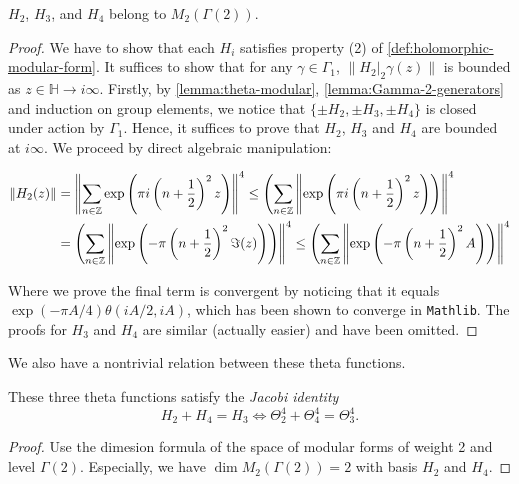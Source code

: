 \begin{lemma}\label{lemma:theta-modular}\leanok
$H_{2}$, $H_{3}$, and $H_{4}$ belong to $M_2(\Gamma(2))$.
\end{lemma}
\begin{proof}
  We have to show that each $H_i$ satisfies property (2) of \cref{def:holomorphic-modular-form}. It suffices to show that for any $\gamma \in \Gamma_1$, $\|H_2|_2\gamma(z)\|$ is bounded as $z \in \mathbb{H} \to i\infty$. Firstly, by \cref{lemma:theta-modular}, \cref{lemma:Gamma-2-generators} and induction on group elements, we notice that $\{\pm H_2, \pm H_3, \pm H_4\}$ is closed under action by $\Gamma_1$. Hence, it suffices to prove that $H_2$, $H_3$ and $H_4$ are bounded at $i\infty$. We proceed by direct algebraic manipulation:

\begin{align}
  \|H_2(z)\|
  &= \left\|\sum_{n \in \mathbb{Z}} \exp\left(\pi i \left(n + \frac{1}{2}\right)^2 z\right)\right\|^4
  \leq \left(\sum_{n \in \mathbb{Z}} \left\|\exp\left(\pi i \left(n + \frac{1}{2}\right)^2 z\right)\right)\right\|^4 \\
  &= \left(\sum_{n \in \mathbb{Z}} \left\|\exp\left(-\pi \left(n + \frac{1}{2}\right)^2 \Im(z)\right)\right)\right\|^4
  \leq \left(\sum_{n \in \mathbb{Z}} \left\|\exp\left(-\pi \left(n + \frac{1}{2}\right)^2 A\right)\right)\right\|^4
\end{align}

  Where we prove the final term is convergent by noticing that it equals $\exp(-\pi A / 4)\theta(iA / 2, iA)$, which has been shown to converge in \texttt{Mathlib}. The proofs for $H_3$ and $H_4$ are similar (actually easier) and have been omitted.

\end{proof}

We also have a nontrivial relation between these theta functions.
\begin{lemma}\label{lemma:jacobi-identity}
These three theta functions satisfy the \emph{Jacobi identity}
\begin{equation}\label{eqn:jacobi-identity}
H_{2} + H_{4} = H_{3} \Leftrightarrow \Theta_{2}^4+ \Theta_{4}^4= \Theta_{3}^4.
\end{equation}
\end{lemma}
\begin{proof}
Use the dimesion formula of the space of modular forms of weight 2 and level $\Gamma(2)$.
Especially, we have $\dim M_2(\Gamma(2)) = 2$ with basis $H_{2}$ and $H_{4}$.
\end{proof}

